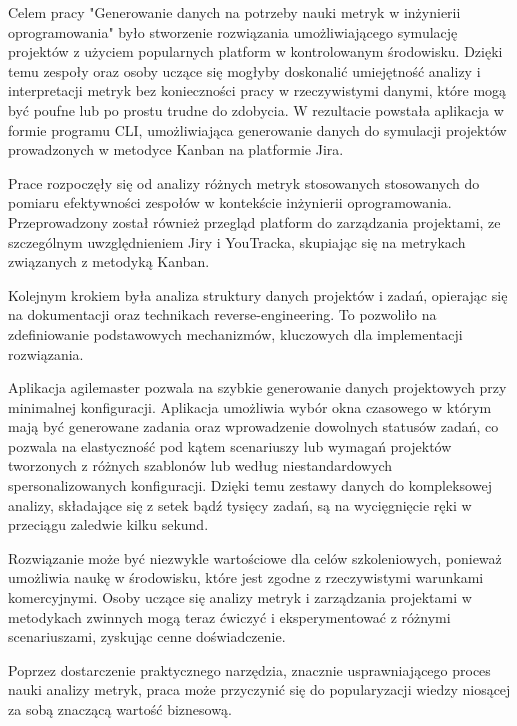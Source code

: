 Celem pracy "Generowanie danych na potrzeby nauki metryk w inżynierii oprogramowania" było stworzenie rozwiązania umożliwiającego symulację projektów z użyciem popularnych platform w kontrolowanym środowisku. Dzięki temu
zespoły oraz osoby uczące się mogłyby doskonalić umiejętność analizy i interpretacji metryk bez konieczności pracy w rzeczywistymi danymi, które mogą być poufne lub po prostu trudne do zdobycia. W rezultacie powstała aplikacja
w formie programu CLI, umożliwiająca generowanie danych do symulacji projektów prowadzonych w metodyce Kanban na platformie Jira.

Prace rozpoczęły się od analizy różnych metryk stosowanych stosowanych do pomiaru efektywności zespołów w kontekście inżynierii oprogramowania. Przeprowadzony został również przegląd platform do zarządzania projektami, ze szczególnym
uwzględnieniem Jiry i YouTracka, skupiając się na metrykach związanych z metodyką Kanban.

Kolejnym krokiem była analiza struktury danych projektów i zadań, opierając się na dokumentacji oraz technikach reverse-engineering. To pozwoliło na zdefiniowanie podstawowych mechanizmów, kluczowych dla implementacji rozwiązania.

Aplikacja agilemaster pozwala na szybkie generowanie danych projektowych przy minimalnej konfiguracji. Aplikacja umożliwia wybór okna czasowego w którym mają być generowane zadania oraz wprowadzenie dowolnych statusów zadań, co pozwala
na elastyczność pod kątem scenariuszy lub wymagań projektów tworzonych z różnych szablonów lub według niestandardowych spersonalizowanych konfiguracji. Dzięki temu zestawy danych do kompleksowej analizy, składające się z setek bądź tysięcy
zadań, są na wycięgnięcie ręki w przeciągu zaledwie kilku sekund.

Rozwiązanie może być niezwykle wartościowe dla celów szkoleniowych, ponieważ umożliwia naukę w środowisku, które jest zgodne z rzeczywistymi warunkami komercyjnymi. Osoby uczące się analizy metryk i zarządzania projektami w metodykach
zwinnych mogą teraz ćwiczyć i eksperymentować z różnymi scenariuszami, zyskując cenne doświadczenie.

Poprzez dostarczenie praktycznego narzędzia, znacznie usprawniającego proces nauki analizy metryk, praca może przyczynić się do popularyzacji wiedzy niosącej za sobą znaczącą wartość biznesową.
